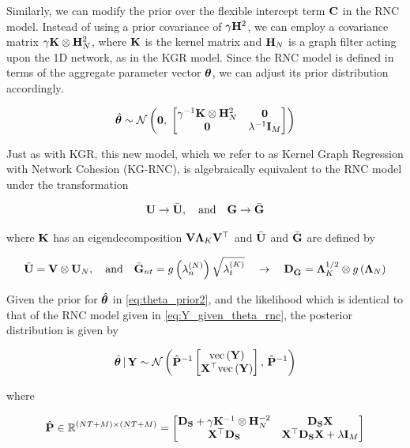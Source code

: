 Similarly, we can modify the prior over the flexible intercept term $\mathbf{C}$ in the RNC model. Instead of using a prior covariance of $\gamma \mathbf{H}^2$, we can employ a covariance matrix $\gamma \mathbf{K} \otimes \mathbf{H}_N^2$, where $\mathbf{K}$ is the kernel matrix and $\mathbf{H}_N$ is a graph filter acting upon the 1D network, as in the KGR model. Since the RNC model is defined in terms of the aggregate parameter vector $\boldsymbol{\theta}$, we can adjust its prior distribution accordingly.

\begin{equation}
    \label{eq:theta_prior2}
    \hat{\boldsymbol{\theta}} \sim \mathcal{N}\left( \mathbf{0}, \; \begin{bmatrix} \gamma^{-1} \mathbf{K} \otimes \mathbf{H}_N^2 & \mathbf{0} \\ \mathbf{0} & \lambda^{-1} \mathbf{I}_M \end{bmatrix} \right)
\end{equation}

Just as with KGR, this new model, which we refer to as Kernel Graph Regression with Network Cohesion (KG-RNC), is algebraically equivalent to the RNC model under the transformation 

$$
\mathbf{U} \rightarrow \bar{\mathbf{U}}, \quad \text{and} \quad \mathbf{G} \rightarrow \bar{\mathbf{G}}
$$

where $\mathbf{K}$ has an eigendecomposition $\mathbf{V} \mathbf{\Lambda}_K \mathbf{V}^\top$ and $\bar{\mathbf{U}}$ and $\bar{\mathbf{G}}$ are defined by

$$
\bar{\mathbf{U}} = \mathbf{V} \otimes \mathbf{U}_N, \quad \text{and} \quad     \bar{\mathbf{G}}_{nt} = g\left(\lambda^{(N)}_n\right) \sqrt{\lambda^{(K)}_t} \quad \rightarrow \quad \mathbf{D}_{\bar{\mathbf{G}}} = \mathbf{\Lambda}_K^{1/2} \otimes g\left(\mathbf{\Lambda}_N\right) 
$$

Given the prior for $\hat{\boldsymbol{\theta}}$ in \cref{eq:theta_prior2}, and the likelihood which is identical to that of the RNC model given in \cref{eq:Y_given_theta_rnc}, the posterior distribution is given by 

\begin{equation}
    \hat{\boldsymbol{\theta}} \, | \, \mathbf{Y} \sim \mathcal{N}\left(\hat{\mathbf{P}}^{-1} \begin{bmatrix} \text{\textup{vec}}\left(\mathbf{Y}\right) \\ \mathbf{X}^\top \text{\textup{vec}}\left(\mathbf{Y}\right) \end{bmatrix}, \, \hat{\mathbf{P}}^{-1}\right)
\end{equation}

where 

\begin{equation}
    \hat{\mathbf{P}} \in \mathbb{R}^{(NT + M) \times (NT + M)}= 
    \begin{bmatrix}
     \mathbf{D}_{\mathbf{S}} + \gamma \mathbf{K}^{-1} \otimes \mathbf{H}_N^{-2} & \mathbf{D}_{\mathbf{S}}  \mathbf{X} \\
     \mathbf{X}^\top \mathbf{D}_{\mathbf{S}} & \mathbf{X}^\top \mathbf{D}_{\mathbf{S}} \mathbf{X} + \lambda \mathbf{I}_M   
    \end{bmatrix}
\end{equation}

